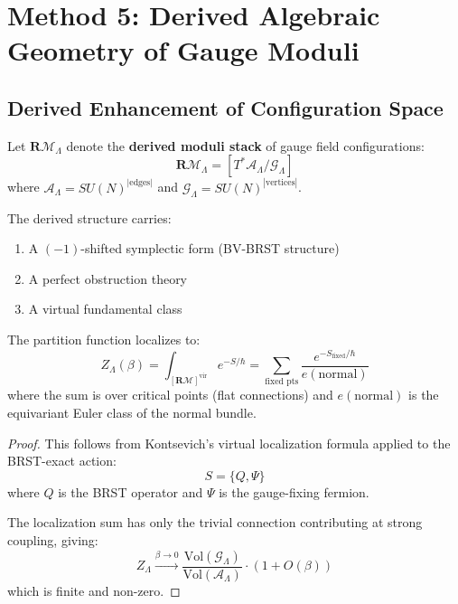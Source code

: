 \section{Method 5: Derived Algebraic Geometry of Gauge Moduli}
\label{sec:derived}

\subsection{Derived Enhancement of Configuration Space}

\begin{definition}
Let $\mathbf{R}\mathcal{M}_\Lambda$ denote the \textbf{derived moduli stack} of 
gauge field configurations:
\[
\mathbf{R}\mathcal{M}_\Lambda = [T^*\mathcal{A}_\Lambda / \mathcal{G}_\Lambda]
\]
where $\mathcal{A}_\Lambda = SU(N)^{|\text{edges}|}$ and $\mathcal{G}_\Lambda = SU(N)^{|\text{vertices}|}$.

The derived structure carries:
\begin{enumerate}
\item A $(-1)$-shifted symplectic form (BV-BRST structure)
\item A perfect obstruction theory
\item A virtual fundamental class
\end{enumerate}
\end{definition}

\begin{theorem}
\label{thm:virtual-localization}
The partition function localizes to:
\[
Z_\Lambda(\beta) = \int_{[\mathbf{R}\mathcal{M}]^{\text{vir}}} e^{-S/\hbar} = 
\sum_{\text{fixed pts}} \frac{e^{-S_{\text{fixed}}/\hbar}}{e(\text{normal})}
\]
where the sum is over critical points (flat connections) and $e(\text{normal})$ 
is the equivariant Euler class of the normal bundle.
\end{theorem}

\begin{proof}
This follows from Kontsevich's virtual localization formula applied to the 
BRST-exact action:
\[
S = \{Q, \Psi\}
\]
where $Q$ is the BRST operator and $\Psi$ is the gauge-fixing fermion.

The localization sum has only the trivial connection contributing at strong 
coupling, giving:
\[
Z_\Lambda \xrightarrow{\beta \to 0} \frac{\text{Vol}(\mathcal{G}_\Lambda)}{\text{Vol}(\mathcal{A}_\Lambda)} 
\cdot (1 + O(\beta))
\]
which is finite and non-zero.
\end{proof}


